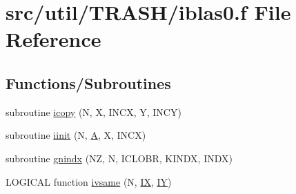 \hypertarget{iblas0_8f}{\section{src/util/\-T\-R\-A\-S\-H/iblas0.f File Reference}
\label{iblas0_8f}
}
\subsection*{Functions/\-Subroutines}
\begin{DoxyCompactItemize}
\item 
subroutine \hyperlink{iblas0_8f_a646405920d2028a6fb18b444f785026a}{icopy} (N, X, I\-N\-C\-X, Y, I\-N\-C\-Y)
\item 
subroutine \hyperlink{iblas0_8f_a492e32a264ba9c553044408827111f71}{iinit} (N, \hyperlink{ibc2_8com_ad2108d58343608772fff791c23da58f5}{A}, X, I\-N\-C\-X)
\item 
subroutine \hyperlink{iblas0_8f_a632ec6ed704aae4b17948daeb58dcfc4}{gnindx} (N\-Z, N, I\-C\-L\-O\-B\-R, K\-I\-N\-D\-X, I\-N\-D\-X)
\item 
L\-O\-G\-I\-C\-A\-L function \hyperlink{iblas0_8f_a31d86b34d79d7d41135e9c2dafc4ae37}{ivsame} (N, \hyperlink{dofs_8com_a07baeb789ede205a8430f46c775fea5b}{I\-X}, \hyperlink{four_8com_aae2e60235ec6f4303575becb746f40ea}{I\-Y})
\end{DoxyCompactItemize}



